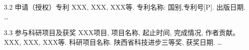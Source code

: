 \begin{resume}
\begin{resumelist}{\hspace{-0.25em}3.2\hspace{0.5em} 申请（授权）专利}
\resumelistitem XXX, XXX, XXX等. 专利名称: 国别,专利号[P]. 出版日期.
\resumelistitem \ldots
\end{resumelist}

\begin{resumelist}{\hspace{-0.25em}3.3\hspace{0.5em} 参与科研项目及获奖}
\resumelistitem XXX项目, 项目名称, 起止时间, 完成情况, 作者贡献。
\resumelistitem XXX, XXX, XXX等. 科研项目名称. 陕西省科技进步三等奖, 获奖日期.
\resumelistitem \ldots
\end{resumelist}
\end{resume}

